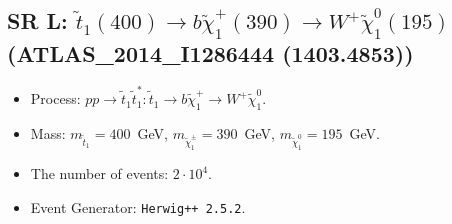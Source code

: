     
\subsection{SR L: $\tilde t_1(400) \to b \tilde \chi_1^+(390) \to W^+ \tilde \chi_1^0(195)$ (ATLAS\_2014\_I1286444 (1403.4853))} 


        \begin{itemize}
        \item  Process: $pp \to \tilde t_1 \tilde t_1^*: \tilde t_1 \to b \tilde \chi_1^+ \to W^+ \tilde \chi_1^0$.
        \item  Mass: $m_{\tilde t_1} = 400$~GeV, $m_{\tilde \chi_1^\pm} = 390$~GeV, $m_{\tilde \chi_1^0} = 195$~GeV.
        \item  The number of events: $2 \cdot 10^4$.
        \item  Event Generator: {\tt Herwig++ 2.5.2}.    
        \end{itemize}    
    
